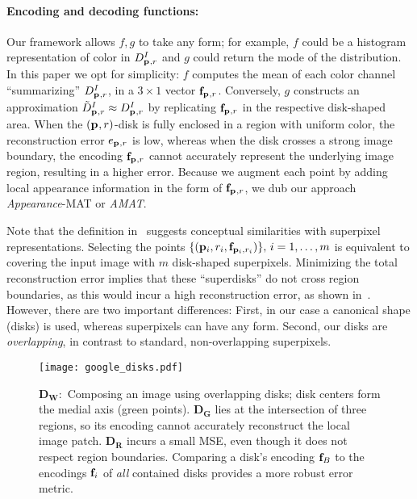 \documentclass[10pt,twocolumn,letterpaper]{article}
\begin{document}
\paragraph{Encoding and decoding functions:}
Our framework allows $f,g$ to take any form; 
for example, $f$ could be a histogram representation of color in $D_{\mathbf{p}_{},r}^I$ and $g$ could return the mode of the distribution.
In this paper we opt for simplicity:
$f$ computes the mean of each color channel ``summarizing'' $D_{\mathbf{p}_{},r}^I$, in a $3\times1$ vector $\mathbf{f}_{\mathbf{p}_{},r}$.
Conversely, $g$ constructs an approximation $\tilde{D}_{\mathbf{p}_{},r}^I \approx D_{\mathbf{p}_{},r}^I$ by replicating $\mathbf{f}_{\mathbf{p}_{},r}$ in the
respective disk-shaped area.
When the $(\mathbf{p}_{},r)$-disk is fully enclosed in a region with uniform color, the reconstruction error $e_{\mathbf{p}_{},r}$
is low, whereas when the disk crosses a strong image boundary, the encoding $\mathbf{f}_{\mathbf{p}_{},r}$ cannot accurately represent
the underlying image region, resulting in a higher error. 
Because we augment each point by adding local appearance information in the form of $\mathbf{f}_{\mathbf{p}_{},r}$, 
we dub our approach \emph{Appearance}-MAT or \emph{AMAT}.

Note that the definition in~ suggests conceptual similarities with superpixel representations.
Selecting the points $\{ (\mathbf{p}_{i},r_i,\mathbf{f}_{\mathbf{p}_{i},r_i}) \},\,i=1,\ldots,m$ is equivalent to covering the input image
with $m$ disk-shaped superpixels. Minimizing the total reconstruction error implies that these ``superdisks'' do not
cross region boundaries, as this would incur a high reconstruction error, as shown in~.
However, there are two important differences:
First, in our case a canonical shape (disks) is used, whereas superpixels can have any form. 
Second, our disks are \emph{overlapping}, in contrast to standard, non-overlapping superpixels.

\begin{figure}[ht]
\centering
\texttt{[image: google\_disks.pdf]}
\caption{$\mathbf{D_W:}$ Composing an image using overlapping disks; disk centers form the medial axis (green points).
$\mathbf{D_G}$ lies at the intersection of three regions, so its encoding cannot accurately reconstruct the local image patch.
$\mathbf{D_R}$ incurs a small MSE, even though it does not respect region boundaries.
Comparing a disk's encoding $\mathbf{f}_{B}$ to the encodings $\mathbf{f}_{i}$ of \emph{all} contained disks provides a more robust
error metric.
}
\label{fig:google}
\end{figure}
\end{document}
